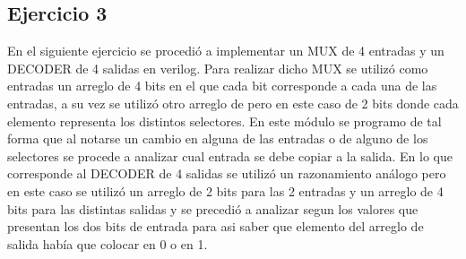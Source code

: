 \documentclass[a4paper]{article}
\begin{document}
\subsection*{Ejercicio 3}
En el siguiente ejercicio se procedió a implementar un MUX de 4 entradas y un DECODER de 4 salidas en verilog.
Para realizar dicho MUX se utilizó como entradas un arreglo de 4 bits en el que cada bit corresponde a cada una de las entradas, a su vez se utilizó otro arreglo de pero en este caso de 2 bits donde cada elemento representa los distintos selectores. En este módulo se programo de tal forma que al notarse un cambio en alguna de las entradas o de alguno de los selectores se procede a analizar cual entrada se debe copiar a la salida.
En lo que corresponde al DECODER de 4 salidas se utilizó un razonamiento análogo pero en este caso se utilizó un arreglo de 2 bits para las 2 entradas y un arreglo de 4 bits para las distintas salidas y se precedió a analizar segun los valores que presentan los dos bits de entrada para asi saber que elemento del arreglo de salida había que colocar en 0 o en 1.
\end{document}

